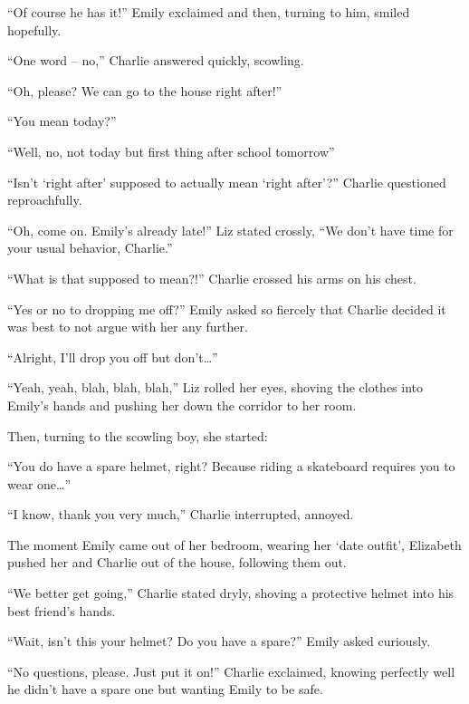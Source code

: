 “Of course he has it!” Emily exclaimed and then, turning to him, smiled hopefully.

“One word – no,” Charlie answered quickly, scowling.

“Oh, please? We can go to the house right after!”

“You mean today?”

“Well, no, not today but first thing after school tomorrow”

“Isn’t ‘right after’ supposed to actually mean ‘right after’?” Charlie questioned reproachfully.

“Oh, come on. Emily’s already late!” Liz stated crossly, “We don’t have time for your usual behavior, Charlie.”

“What is that supposed to mean?!” Charlie crossed his arms on his chest.

“Yes or no to dropping me off?” Emily asked so fiercely that Charlie decided it was best to not argue with her any further.

“Alright, I’ll drop you off but don’t…”

“Yeah, yeah, blah, blah, blah,” Liz rolled her eyes, shoving the clothes into Emily’s hands and pushing her down the corridor to her room.

Then, turning to the scowling boy, she started:
  
“You do have a spare helmet, right? Because riding a skateboard requires you to wear one…”
  
“I know, thank you very much,” Charlie interrupted, annoyed.

The moment Emily came out of her bedroom, wearing her ‘date outfit’, Elizabeth pushed her and Charlie out of the house, following them out.
  
“We better get going,” Charlie stated dryly, shoving a protective helmet into his best friend’s hands.

“Wait, isn’t this your helmet? Do you have a spare?” Emily asked curiously.

“No questions, please. Just put it on!” Charlie exclaimed, knowing perfectly well he didn’t have a spare one but wanting Emily to be safe.